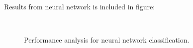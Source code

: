 Results from neural network is included in figure: 
\begin{figure}[H]
\begin{center}
     \\
\end{center}
\caption[caption]{Performance analysis for neural network classification.}
\end{figure}

